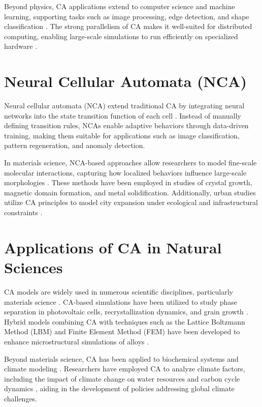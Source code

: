 \documentclass[11pt]{article}
\begin{document}
Beyond physics, CA applications extend to computer science and machine learning, supporting tasks such as image processing, edge detection, and shape classification \cite{lecun_Deep_2015}. The strong parallelism of CA makes it well-suited for distributed computing, enabling large-scale simulations to run efficiently on specialized hardware \cite{jouppi_InDatacenter_2017}.

\section*{\small Neural Cellular Automata (NCA)}
Neural cellular automata (NCA) extend traditional CA by integrating neural networks into the state transition function of each cell \cite{li_Deep_2023}. Instead of manually defining transition rules, NCAs enable adaptive behaviors through data-driven training, making them suitable for applications such as image classification, pattern regeneration, and anomaly detection.

In materials science, NCA-based approaches allow researchers to model fine-scale molecular interactions, capturing how localized behaviors influence large-scale morphologies \cite{catrina_Learning_2024}. These methods have been employed in studies of crystal growth, magnetic domain formation, and metal solidification. Additionally, urban studies utilize CA principles to model city expansion under ecological and infrastructural constraints \cite{tang_Urban_2024}.

\section*{\small Applications of CA in Natural Sciences}
CA models are widely used in numerous scientific disciplines, particularly materials science \cite{zhi_Review_2024, raabe_Cellular_2002}. CA-based simulations have been utilized to study phase separation in photovoltaic cells, recrystallization dynamics, and grain growth \cite{peumans_Efficient_2003}. Hybrid models combining CA with techniques such as the Lattice Boltzmann Method (LBM) and Finite Element Method (FEM) have been developed to enhance microstructural simulations of alloys \cite{lee_Numerical_2022, meng_Multiscale_2022}.

Beyond materials science, CA has been applied to biochemical systems and climate modeling \cite{kier_Cellular_2005, racz_Cellular_2003}. Researchers have employed CA to analyze climate factors, including the impact of climate change on water resources \cite{kassogue_Cellular_2019} and carbon cycle dynamics \cite{klaus_CarbonCycle_2011}, aiding in the development of policies addressing global climate challenges.
\end{document}
